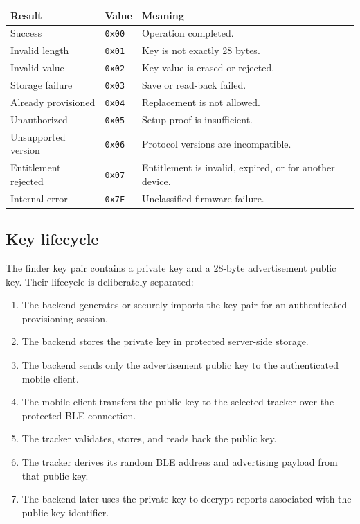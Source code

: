 \documentclass[12pt,a4paper]{article}
\newcommand{\code}[1]{\texttt{#1}}
\begin{document}
\begin{table}[ht]
    \centering
    \begin{tabularx}{0.9\textwidth}{p{3.2cm}p{2.0cm}X}
        \toprule
        \textbf{Result} & \textbf{Value} & \textbf{Meaning} \\
        \midrule
        Success & \code{0x00} & Operation completed. \\
        Invalid length & \code{0x01} & Key is not exactly 28 bytes. \\
        Invalid value & \code{0x02} & Key value is erased or rejected. \\
        Storage failure & \code{0x03} & Save or read-back failed. \\
        Already provisioned & \code{0x04} & Replacement is not allowed. \\
        Unauthorized & \code{0x05} & Setup proof is insufficient. \\
        Unsupported version & \code{0x06} & Protocol versions are incompatible. \\
        Entitlement rejected & \code{0x07} & Entitlement is invalid, expired, or for another device. \\
        Internal error & \code{0x7F} & Unclassified firmware failure. \\
        \bottomrule
    \end{tabularx}
\end{table}

\subsection{Key lifecycle}

The finder key pair contains a private key and a 28-byte advertisement public
key. Their lifecycle is deliberately separated:

\begin{enumerate}
    \item The backend generates or securely imports the key pair for an
    authenticated provisioning session.
    \item The backend stores the private key in protected server-side storage.
    \item The backend sends only the advertisement public key to the
    authenticated mobile client.
    \item The mobile client transfers the public key to the selected tracker
    over the protected BLE connection.
    \item The tracker validates, stores, and reads back the public key.
    \item The tracker derives its random BLE address and advertising payload
    from that public key.
    \item The backend later uses the private key to decrypt reports associated
    with the public-key identifier.
\end{enumerate}
\end{document}
